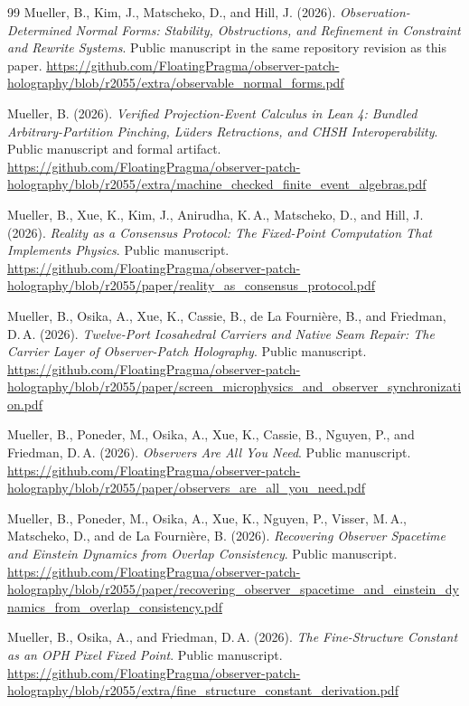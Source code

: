 \documentclass[11pt]{article}
\theoremstyle{definition}
\theoremstyle{remark}
\begin{document}
{\begin{thebibliography}{99}
Mueller, B., Kim, J., Matscheko, D., and Hill, J. (2026).
\emph{Observation-Determined Normal Forms: Stability, Obstructions, and
Refinement in Constraint and Rewrite Systems}. Public manuscript in the same repository revision as this paper.
\url{https://github.com/FloatingPragma/observer-patch-holography/blob/r2055/extra/observable_normal_forms.pdf}

Mueller, B. (2026). \emph{Verified Projection-Event Calculus in Lean 4:
Bundled Arbitrary-Partition Pinching, L\"uders Retractions, and CHSH
Interoperability}. Public manuscript and formal artifact.
\url{https://github.com/FloatingPragma/observer-patch-holography/blob/r2055/extra/machine_checked_finite_event_algebras.pdf}

Mueller, B., Xue, K., Kim, J., Anirudha, K.\,A., Matscheko, D., and Hill, J. (2026).
\emph{Reality as a Consensus Protocol: The Fixed-Point Computation That
Implements Physics}. Public manuscript.
\url{https://github.com/FloatingPragma/observer-patch-holography/blob/r2055/paper/reality_as_consensus_protocol.pdf}

Mueller, B., Osika, A., Xue, K., Cassie, B., de La Fourni\`ere, B., and Friedman, D.\,A.
(2026).
 \emph{Twelve-Port Icosahedral Carriers and Native Seam Repair: The Carrier Layer of Observer-Patch Holography}. Public
manuscript.
\url{https://github.com/FloatingPragma/observer-patch-holography/blob/r2055/paper/screen_microphysics_and_observer_synchronization.pdf}

Mueller, B., Poneder, M., Osika, A., Xue, K., Cassie, B., Nguyen, P., and Friedman, D.\,A.
(2026). \emph{Observers Are All You Need}. Public manuscript.
\url{https://github.com/FloatingPragma/observer-patch-holography/blob/r2055/paper/observers_are_all_you_need.pdf}

Mueller, B., Poneder, M., Osika, A., Xue, K., Nguyen, P., Visser, M.\,A.,
Matscheko, D., and de La Fourni\`ere, B. (2026). \emph{Recovering Observer
Spacetime and Einstein
Dynamics from Overlap Consistency}. Public manuscript.
\url{https://github.com/FloatingPragma/observer-patch-holography/blob/r2055/paper/recovering_observer_spacetime_and_einstein_dynamics_from_overlap_consistency.pdf}

Mueller, B., Osika, A., and Friedman, D.\,A. (2026). \emph{The Fine-Structure Constant as an OPH
Pixel Fixed Point}. Public manuscript.
\url{https://github.com/FloatingPragma/observer-patch-holography/blob/r2055/extra/fine_structure_constant_derivation.pdf}


\end{thebibliography}}
\end{document}
